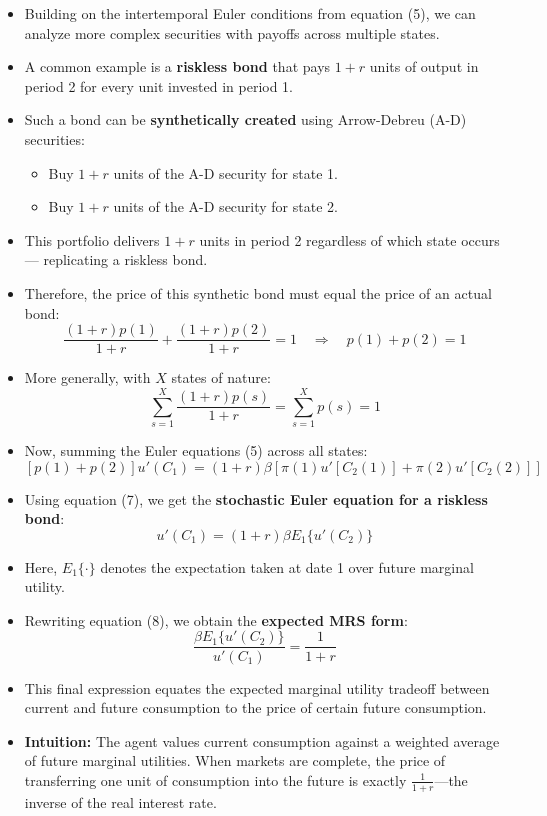 \documentclass[12pt]{article}
\begin{document}
\begin{itemize}
\item Building on the intertemporal Euler conditions from equation (5), we can analyze more complex securities with payoffs across multiple states.

\item A common example is a \textbf{riskless bond} that pays \( 1 + r \) units of output in period 2 for every unit invested in period 1.

\item Such a bond can be \textbf{synthetically created} using Arrow-Debreu (A-D) securities:
  \begin{itemize}
    \item Buy \( 1 + r \) units of the A-D security for state 1.
    \item Buy \( 1 + r \) units of the A-D security for state 2.
  \end{itemize}

\item This portfolio delivers \( 1 + r \) units in period 2 regardless of which state occurs — replicating a riskless bond.

\item Therefore, the price of this synthetic bond must equal the price of an actual bond:
\[
\frac{(1 + r)p(1)}{1 + r} + \frac{(1 + r)p(2)}{1 + r} = 1 \quad \Rightarrow \quad p(1) + p(2) = 1 \tag{7}
\]

\item More generally, with \( X \) states of nature:
\[
\sum_{s = 1}^{X} \frac{(1 + r)p(s)}{1 + r} = \sum_{s = 1}^{X} p(s) = 1
\]

\item Now, summing the Euler equations (5) across all states:
\[
[p(1) + p(2)] u'(C_1) = (1 + r) \beta [\pi(1) u'[C_2(1)] + \pi(2) u'[C_2(2)]]
\]

\item Using equation (7), we get the \textbf{stochastic Euler equation for a riskless bond}:
\[
u'(C_1) = (1 + r) \beta E_1\{u'(C_2)\} \tag{8}
\]

\item Here, \( E_1\{ \cdot \} \) denotes the expectation taken at date 1 over future marginal utility.

\item Rewriting equation (8), we obtain the \textbf{expected MRS form}:
\[
\frac{\beta E_1\{u'(C_2)\}}{u'(C_1)} = \frac{1}{1 + r}
\]

\item This final expression equates the expected marginal utility tradeoff between current and future consumption to the price of certain future consumption.

\item \textbf{Intuition:} The agent values current consumption against a weighted average of future marginal utilities. When markets are complete, the price of transferring one unit of consumption into the future is exactly \( \frac{1}{1 + r} \)—the inverse of the real interest rate.
\end{itemize}
\end{document}
